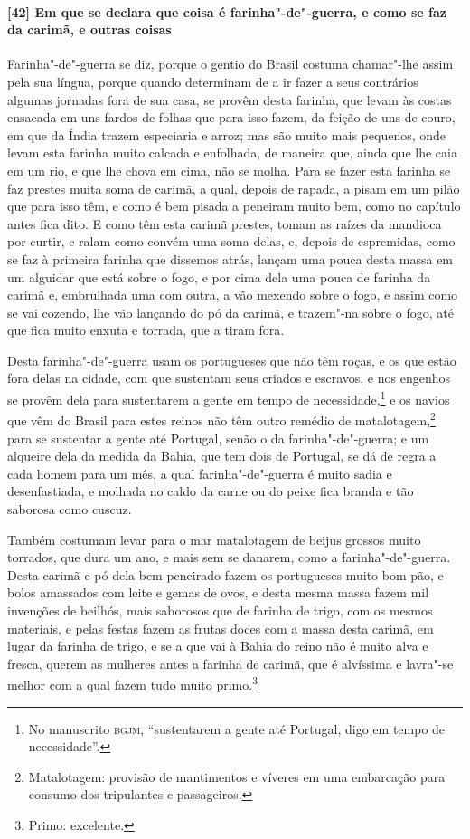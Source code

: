 \begin{linenumbers}
\paragraph{[42] Em que se declara que coisa é farinha"-de"-guerra, e como se faz da carimã, e outras coisas}\quad
Farinha"-de"-guerra se diz, porque o gentio do Brasil costuma chamar"-lhe assim pela sua
língua, porque quando determinam de a ir fazer a seus contrários algumas jornadas fora de
sua casa, se provêm desta farinha, que levam às costas ensacada em uns fardos de folhas
que para isso fazem, da feição de uns de couro, em que da Índia trazem especiaria e arroz;
mas são muito mais pequenos, onde levam esta farinha muito calcada e enfolhada, de maneira
que, ainda que lhe caia em um rio, e que lhe chova em cima, não se molha. Para se fazer
esta farinha se faz prestes muita soma de carimã, a qual, depois de rapada, a pisam em um
pilão que para isso têm, e como é bem pisada a peneiram muito bem, como no capítulo antes
fica dito. E como têm esta carimã prestes, tomam as raízes da mandioca por curtir, e ralam
como convém uma soma delas, e, depois de espremidas, como se faz à primeira farinha que
dissemos atrás, lançam uma pouca desta massa em um alguidar que está sobre o fogo, e por
cima dela uma pouca de farinha da carimã e, embrulhada uma com outra, a vão mexendo sobre
o fogo, e assim como se vai cozendo, lhe vão lançando do pó da carimã, e trazem"-na sobre o
fogo, até que fica muito enxuta e torrada, que a tiram fora.

Desta farinha"-de"-guerra usam os portugueses que não têm roças, e os que estão fora delas
na cidade, com que sustentam seus criados e escravos, e nos engenhos se provêm dela para
sustentarem a gente em tempo de necessidade,\footnote{ No manuscrito \textsc{bgjm},
``sustentarem a gente até Portugal, digo em tempo de necessidade''.} e os navios que vêm
do Brasil para estes reinos não têm outro remédio de matalotagem,\footnote{ Matalotagem:
provisão de mantimentos e víveres em uma embarcação para consumo dos tripulantes e
passageiros.} para se sustentar a gente até Portugal, senão o da farinha"-de"-guerra; e um
alqueire dela da medida da Bahia, que tem dois de Portugal, se dá de regra a cada homem
para um mês, a qual farinha"-de"-guerra é muito sadia e desenfastiada, e molhada no caldo da
carne ou do peixe fica branda e tão saborosa como cuscuz.

Também costumam levar para o mar matalotagem de beijus grossos muito torrados, que dura um
ano, e mais sem se danarem, como a farinha"-de"-guerra. Desta carimã e pó dela bem peneirado
fazem os portugueses muito bom pão, e bolos amassados com leite e gemas de ovos, e desta
mesma massa fazem mil invenções de beilhós, mais saborosos que de farinha de trigo, com os
mesmos materiais, e pelas festas fazem as frutas doces com a
massa desta carimã, em lugar da farinha de trigo, e se a que vai à Bahia do reino não é
muito alva e fresca, querem as mulheres antes a farinha de carimã, que é alvíssima e
lavra"-se melhor com a qual fazem tudo muito primo.\footnote{ Primo: excelente.}


\end{linenumbers}
